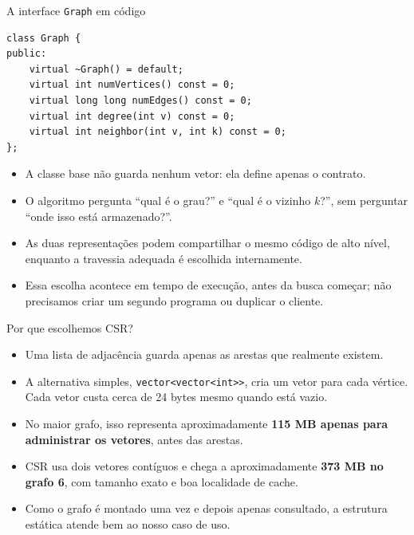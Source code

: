 \documentclass[10pt]{beamer}
\begin{document}
\begin{frame}[fragile]{A interface \texttt{Graph} em c\'odigo}
\begin{lstlisting}
class Graph {
public:
    virtual ~Graph() = default;
    virtual int numVertices() const = 0;
    virtual long long numEdges() const = 0;
    virtual int degree(int v) const = 0;
    virtual int neighbor(int v, int k) const = 0;
};
\end{lstlisting}
\begin{itemize}
\item A classe base n\~ao guarda nenhum vetor: ela define apenas o contrato.
\item O algoritmo pergunta ``qual \'e o grau?'' e ``qual \'e o vizinho $k$?'',
sem perguntar ``onde isso est\'a armazenado?''.
\item As duas representa\c c\~oes podem compartilhar o mesmo c\'odigo de alto
n\'ivel, enquanto a travessia adequada \'e escolhida internamente.
\item Essa escolha acontece em tempo de execu\c c\~ao, antes da busca come\c car;
n\~ao precisamos criar um segundo programa ou duplicar o cliente.
\end{itemize}
\end{frame}

\begin{frame}{Por que escolhemos CSR?}
\begin{itemize}
\item Uma lista de adjac\^encia guarda apenas as arestas que realmente existem.
\item A alternativa simples, \texttt{vector<vector<int>>}, cria um vetor para
cada v\'ertice. Cada vetor custa cerca de 24 bytes mesmo quando est\'a vazio.
\item No maior grafo, isso representa aproximadamente \textbf{115 MB apenas
para administrar os vetores}, antes das arestas.
\item CSR usa dois vetores cont\'iguos e chega a aproximadamente
\textbf{373 MB no grafo 6}, com tamanho exato e boa localidade de cache.
\item Como o grafo \'e montado uma vez e depois apenas consultado, a estrutura
est\'atica atende bem ao nosso caso de uso.
\end{itemize}
\end{frame}
\end{document}
